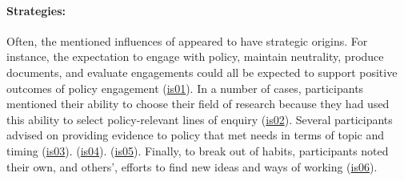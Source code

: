 \paragraph{Strategies:}
Often, the mentioned influences of \skiinst{} appeared to have strategic origins. For instance, the expectation to engage with policy, maintain neutrality, produce documents, and evaluate engagements could all be expected to support positive outcomes of policy engagement (\hyperref[tab:resskiinststrat]{is01}). In a number of cases, participants mentioned their ability to choose their field of research because they had used this ability to select policy-relevant lines of enquiry (\hyperref[tab:resskiinststrat]{is02}). Several participants advised on providing evidence to policy that met needs in terms of topic and timing (\hyperref[tab:resskiinststrat]{is03}).  (\hyperref[tab:resskiinststrat]{is04}).  (\hyperref[tab:resskiinststrat]{is05}). Finally, to break out of habits, participants noted their own, and others', efforts to find new ideas and ways of working (\hyperref[tab:resskiinststrat]{is06}).

\subsection{\titinfr}\label{sec:resskiinfr}

